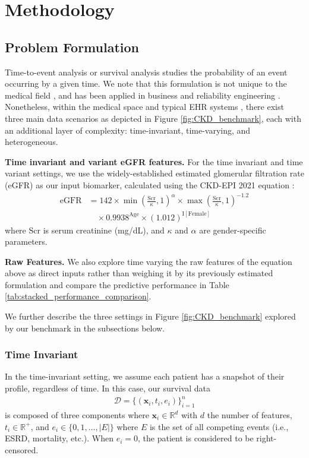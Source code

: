 \section{Methodology}

\subsection{Problem Formulation} \label{sec: problem formulation}

Time-to-event analysis or survival analysis studies the probability of an event occurring by a given time. We note that this formulation is not unique to the medical field \citep{friedman2015fundamentals_medical_clinical_trials}, and has been applied in business \citep{morrison2004introduction_business} and reliability engineering \citep{pena2004models_reliability_engineering}. Nonetheless, within the medical space and typical EHR systems \citep{kline2022multimodal_medical}, there exist three main data scenarios as depicted in Figure \ref{fig:CKD_benchmark}, each with an additional layer of complexity: time-invariant, time-varying, and heterogeneous.

\textbf{Time invariant and variant eGFR features.} For the time invariant and time variant settings, we use the widely-established estimated glomerular filtration rate (eGFR) as our input biomarker, calculated using the CKD-EPI 2021 equation \citep{omuse2024new_creatinine_epi_equation}:
\begin{align}
\mathrm{eGFR} &= 142 \times \min\left(\frac{\mathrm{Scr}}{\kappa}, 1\right)^{\alpha} \times \max\left(\frac{\mathrm{Scr}}{\kappa}, 1\right)^{-1.2} \nonumber \\
&\quad \times 0.9938^{\mathrm{Age}} \times (1.012)^{\mathrm{I}[\mathrm{Female}]}
\end{align}
where $\mathrm{Scr}$ is serum creatinine (mg/dL), and $\kappa$ and $\alpha$ are gender-specific parameters. 

\textbf{Raw Features.} We also explore time varying the raw features of the equation above as direct inputs rather than weighing it by its previously estimated formulation and compare the predictive performance in Table \ref{tab:stacked_performance_comparison}.

We further describe the three settings in Figure \ref{fig:CKD_benchmark} explored by our benchmark in the subsections below.

\subsubsection{Time Invariant}
In the time-invariant setting, we assume each patient has a snapshot of their profile, regardless of time. In this case, our survival data
\begin{align}
\mathcal{D} = \{(\boldsymbol{x}_i, t_i, e_i)\}_{i=1}^n
\end{align}
is composed of three components where $\boldsymbol{x}_i \in \mathbb{R}^d$ with $d$ the number of features, $t_i \in \mathbb{R}^+$, and $e_i \in \{0,1,\dots,|E|\}$ where $E$ is the set of all competing events (i.e., ESRD, mortality, etc.). When $e_i = 0$, the patient is considered to be right-censored.

